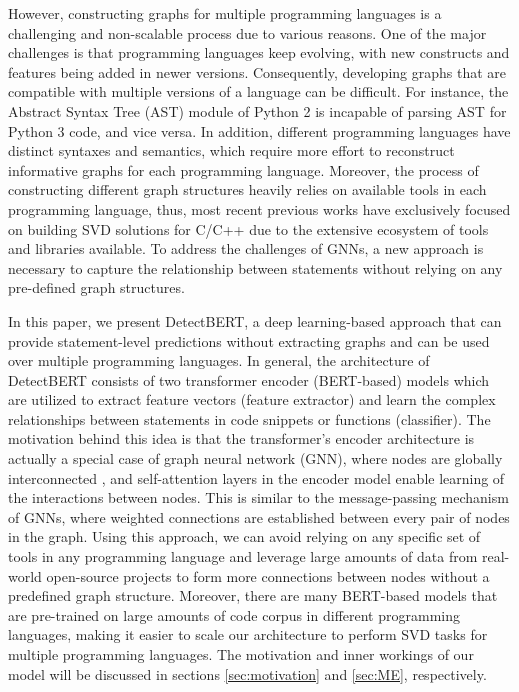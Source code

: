\documentclass{ieeeaccess}
\begin{document}
However, constructing graphs for multiple programming languages is a challenging and non-scalable process due to various reasons. One of the major challenges is that programming languages keep evolving, with new constructs and features being added in newer versions. Consequently, developing graphs that are compatible with multiple versions of a language can be difficult. For instance, the Abstract Syntax Tree (AST) module of Python 2 is incapable of parsing AST for Python 3 code, and vice versa. In addition, different programming languages have distinct syntaxes and semantics, which require more effort to reconstruct informative graphs for each programming language. Moreover, the process of constructing different graph structures heavily relies on available tools in each programming language, thus, most recent previous works \cite{Are,devign,DeepWukong,Linevd,MVD,IVDetect} have exclusively focused on building SVD solutions for C/C++  due to  the extensive ecosystem of tools and libraries available\cite{c_tool1,c_tool2,ctool3,ctool4}. To address the challenges of GNNs, a new approach is necessary to capture the relationship between statements without relying on any pre-defined graph structures.


\par %
In this paper, we present DetectBERT, a deep learning-based approach that can provide statement-level predictions without extracting graphs and can be used over multiple programming languages. In general, the architecture of DetectBERT consists of  two transformer encoder (BERT-based) models which are utilized to extract feature vectors (feature extractor) and learn the complex relationships between statements in code snippets or functions (classifier). The motivation behind this idea is that  the transformer's encoder architecture is actually a special case of graph neural network (GNN), where nodes are globally interconnected \cite{transformer2graph}, and self-attention layers in the encoder model enable learning of the interactions between nodes. This is similar to the message-passing mechanism of GNNs, where weighted connections are established between every pair of nodes in the graph. Using this approach, we can avoid relying on any specific set of tools in any programming language and leverage large amounts of data from real-world open-source projects to form more connections between nodes without a predefined graph structure. Moreover, there are many BERT-based models \cite{sBERT,codebert, minilm,mpnet, zhou2023codeBERTscore} that are pre-trained on large amounts of code corpus in different programming languages, making it easier to scale our architecture to perform SVD tasks for multiple programming languages. The motivation and inner workings of our model will be discussed in sections \ref{sec:motivation} and \ref{sec:ME}, respectively.
\end{document}
